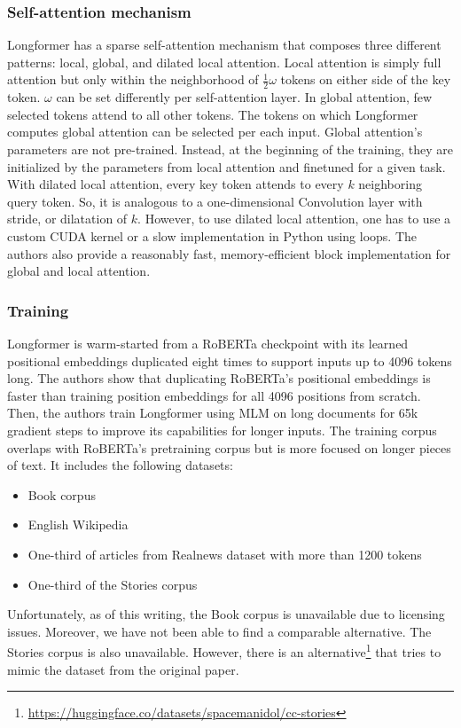 \subsubsection{Self-attention mechanism}

Longformer has a sparse self-attention mechanism that composes three different
patterns: local, global, and dilated local attention. Local attention is simply
full attention but only within the neighborhood of $\frac{1}{2}\omega$ tokens
on either side of the key token. $\omega$ can be set differently per
self-attention layer. In global attention, few selected tokens attend to all
other tokens. The tokens on which Longformer computes global attention can be
selected per each input. Global attention's parameters are not pre-trained.
Instead, at the beginning of the training, they are initialized by the
parameters from local attention and finetuned for a given task. With dilated
local attention, every key token attends to every $k$ neighboring query token.
So, it is analogous to a one-dimensional Convolution layer
\citep{van2016wavenet} with stride, or dilatation of $k$. However, to use
dilated local attention, one has to use a custom CUDA kernel or a slow
implementation in Python using loops. The authors also provide a reasonably
fast, memory-efficient block implementation for global and local
attention.

\subsubsection{Training}

Longformer is warm-started from a RoBERTa \citep{liu2019roberta} checkpoint
with its learned positional embeddings duplicated eight times to support inputs
up to 4096 tokens long. The authors show that duplicating RoBERTa's positional
embeddings is faster than training position embeddings for all 4096 positions
from scratch. Then, the authors train Longformer using MLM on long documents
for 65k gradient steps to improve its capabilities for longer inputs. The
training corpus overlaps with RoBERTa's pretraining corpus but is more focused
on longer pieces of text. It includes the following datasets:

\begin{itemize}

  \item Book corpus \citep{zhu2015aligning}

  \item English Wikipedia

  \item One-third of articles from Realnews dataset \citep{zellers2019defending}
      with more than 1200 tokens

  \item One-third of the Stories corpus \citep{trinh2018simple}

\end{itemize}

Unfortunately, as of this writing, the Book corpus is unavailable due to
licensing issues. Moreover, we have not been able to find a comparable
alternative. The Stories corpus is also unavailable. However, there is an
alternative\footnote{\url{https://huggingface.co/datasets/spacemanidol/cc-stories}}
that tries to mimic the dataset from the original paper.
